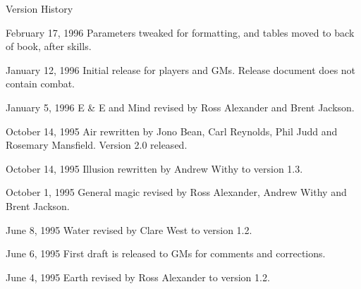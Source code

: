 \begin{Chapter}{Version History}
\begin{Description}
\item[February 17, 1996] Parameters tweaked for formatting, and tables
  moved to back of book, after skills.

\item[January 12, 1996] Initial release for players and GMs. Release
  document does not contain combat.

\item[January 5, 1996] E \& E and Mind revised by Ross Alexander and
  Brent Jackson.

\item[October 14, 1995] Air rewritten by Jono Bean, Carl Reynolds,
  Phil Judd and Rosemary Mansfield.  Version 2.0 released.

\item[October 14, 1995] Illusion rewritten by Andrew Withy to version
  1.3.

\item[October 1, 1995] General magic revised by Ross Alexander, Andrew
  Withy and Brent Jackson.

\item[June 8, 1995] Water revised by Clare West to version 1.2.

\item[June 6, 1995] First draft is released to GMs for comments and
  corrections.

\item[June 4, 1995] Earth revised by Ross Alexander to version 1.2.

\end{Description}

\end{Chapter}
